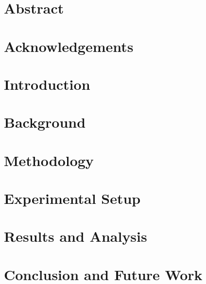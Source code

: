 \documentclass[12pt,a4paper, twoside]{report}
\begin{document}



\newpage
\thispagestyle{empty} %
\mbox{} %
\newpage

\chapter*{Abstract}



\chapter*{Acknowledgements}


\tableofcontents
\newpage

\newpage
{}

\chapter{Introduction}


\chapter{Background}


\chapter{Methodology}


\chapter{Experimental Setup}


\chapter{Results and Analysis}


\chapter{Conclusion and Future Work}


\printbibliography

\begin{appendices}

\end{appendices}
\end{document}
